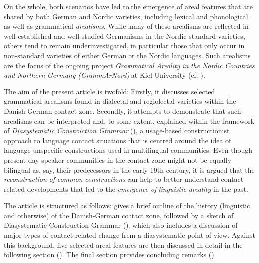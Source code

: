 \documentclass[output=paper]{langsci/langscibook}
\begin{document}
On the whole, both scenarios have led to the emergence of areal features that are shared by both German and Nordic varieties, including lexical and phonological as well as grammatical \textit{arealisms}. While many of these arealisms are reflected in well-established and well-studied Germanisms in the Nordic standard varieties, others tend to remain underinvestigated, in particular those that only occur in non-standard varieties of either German or the Nordic languages. Such arealisms are the focus of the ongoing project \textit{Grammatical} \textit{Areality} \textit{in} \textit{the} \textit{Nordic} \textit{Countries} \textit{and} \textit{Northern} \textit{Germany} \textit{(GrammArNord)} at Kiel University (cf. \citealt{Hoder.2016a}).

The aim of the present article is twofold: Firstly, it discusses selected grammatical arealisms found in dialectal and regiolectal varieties within the Danish-German contact zone. Secondly, it attempts to demonstrate that such arealisms can be interpreted and, to some extent, explained within the framework of \textit{Diasystematic} \textit{Construction} \textit{Grammar} (\citealt{Hoder.2012, Hoder.2014, Hoder.2018}), a usage-based constructionist approach to language contact situations that is centred around the idea of language-unspecific constructions used in multilingual communities. Even though present-day speaker communities in the contact zone might not be equally bilingual as, say, their predecessors in the early 19th century, it is argued that the \textit{reconstruction} \textit{of} \textit{common} \textit{constructions} can help to better understand contact-related developments that led to the \textit{emergence} \textit{of} \textit{linguistic} \textit{areality} in the past.

The article is structured as follows:  gives a brief outline of the history (linguistic and otherwise) of the Danish-German contact zone, followed by a sketch of Diasystematic Construction Grammar (), which also includes a discussion of major types of contact-related change from a diasystematic point of view. Against this background, five selected areal features are then discussed in detail in the following section (). The final section provides concluding remarks ().


\label{sec:hoeder:2}
\end{document}
